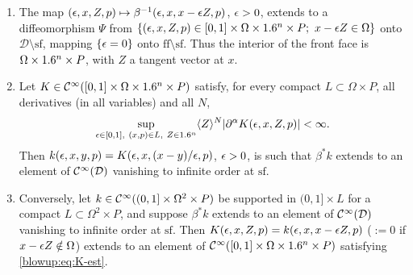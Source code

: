 \begin{proposition}\label{blowup:prop:sc-kernels}
\begin{enumerate}[label=\textup{(\roman*)}]
\item The map $(\epsilon,x,Z,p)\mapsto\beta^{-1}(\epsilon,x,x-\epsilon Z,p)$, $\epsilon>0$, extends to a
diffeomorphism $\Psi$ from $\{(\epsilon,x,Z,p)\in[0,1]\times\Omega\times1.6^n\times P;\
x-\epsilon Z\in\Omega\}$ onto $\mathcal D\setminus\mathrm{sf}$, mapping $\{\epsilon=0\}$ onto
$\mathrm{ff}\setminus\mathrm{sf}$. Thus the interior of the front face is
$\Omega\times1.6^n\times P$, with $Z$ a tangent vector at $x$.
\item Let $K\in\mathcal{C}^\infty([0,1]\times\Omega\times1.6^n\times P)$ satisfy, for every compact
$L\subset\Omega\times P$, all derivatives (in all variables) and all $N$,
\begin{equation}\label{blowup:eq:K-est}
  \sup_{\epsilon\in[0,1],\ (x,p)\in L,\ Z\in1.6^n}\langle Z\rangle^N\lvert \partial^\alpha K(\epsilon,x,Z,p)\rvert<\infty.
\end{equation}
Then $k(\epsilon,x,y,p)=K(\epsilon,x,(x-y)/\epsilon,p)$, $\epsilon>0$, is such that $\beta^*k$ extends to an
element of $\mathcal{C}^\infty(\mathcal D)$ vanishing to infinite order at $\mathrm{sf}$.
\item Conversely, let $k\in\mathcal{C}^\infty((0,1]\times\Omega^2\times P)$ be supported in
$(0,1]\times L$ for a compact $L\subset\Omega^2\times P$, and suppose $\beta^*k$ extends to an
element of $\mathcal{C}^\infty(\mathcal D)$ vanishing to infinite order at $\mathrm{sf}$. Then
$K(\epsilon,x,Z,p)=k(\epsilon,x,x-\epsilon Z,p)$ \textup{(}$:=0$ if $x-\epsilon Z\notin\Omega$\textup{)}
extends to an element of $\mathcal{C}^\infty([0,1]\times\Omega\times1.6^n\times P)$ satisfying
\eqref{blowup:eq:K-est}.
\end{enumerate}
\end{proposition}
